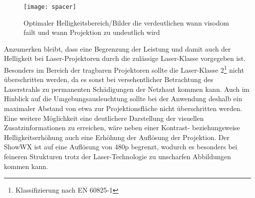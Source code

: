 \begin{figure}[!ht]
	\begin{center}
		\texttt{[image: spacer]}
		\caption{Optimaler Helligkeitsbereich/Bilder die verdeutlichen wann visodom failt und wann Projektion zu undeutlich wird}
		\label{fig.optlight}
	\end{center}
\end{figure}

Anzumerken bleibt, dass eine Begrenzung der Leistung und damit auch der Helligkeit bei Laser-Projektoren durch die zulässige Laser-Klasse vorgegeben ist. Besonders im Bereich der tragbaren Projektoren sollte die Laser-Klasse 2\footnote{Klassifizierung nach EN 60825-1} nicht überschritten werden, da es sonst bei versehentlicher Betrachtung des Laserstrahls zu permanenten Schädigungen der Netzhaut kommen kann. Auch im Hinblick auf die  Umgebungsausleuchtung sollte bei der Anwendung deshalb ein maximaler Abstand von etwa \red[TODO] zur Projektionsfläche nicht überschritten werden.\\

Eine weitere Möglichkeit eine deutlichere Darstellung der visuellen Zusatzinformationen zu erreichen, wäre neben einer Kontrast- beziehungsweise Helligkeitserhöhung auch eine Erhöhung der Auflösung der Projektion. Der ShowWX ist auf eine Auflösung von 480p begrenzt, wodurch es besonders bei feineren Strukturen trotz der Laser-Technologie zu unscharfen Abbildungen kommen kann.\\







